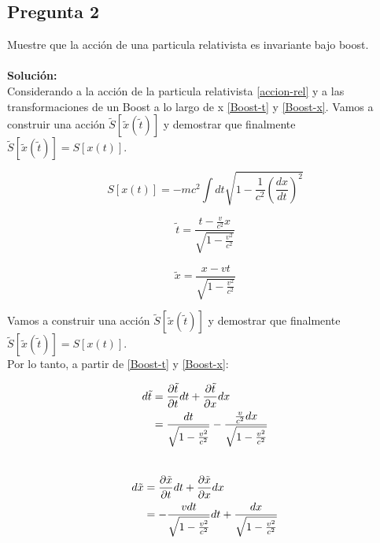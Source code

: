 \documentclass[../main_ej.tex]{subfiles}
\begin{document}
\subsection{Pregunta 2}
Muestre que la acción de una particula relativista es invariante bajo boost. \\
\\
\textbf{Solución:} 
\\

Considerando a la acción de la particula relativista \eqref{accion-rel} y a las transformaciones de un Boost a lo largo de x \eqref{Boost-t} y \eqref{Boost-x}. Vamos a construir una acción $\tilde{S}[\tilde{x}(\tilde{t})]$ y demostrar que finalmente $\tilde{S}[\tilde{x}(\tilde{t})] = S[x(t)]$. 

\begin{equation}
  S[x(t)] = -mc^2\int dt \sqrt{1 - \frac{1}{c^2}\left( \frac{dx}{dt} \right)^2} \label{accion-rel}
\end{equation}

\begin{equation}
  \tilde{t} = \frac{t - \frac{v}{c^2}x}{\sqrt{1 - \frac{v^2}{c^2}}} \label{Boost-t}
\end{equation}

\begin{equation}
  \tilde{x} = \frac{x - vt}{\sqrt{1 - \frac{v^2}{c^2}}} \label{Boost-x}
\end{equation}

Vamos a construir una acción $\tilde{S}[\tilde{x}(\tilde{t})]$ y demostrar que finalmente $\tilde{S}[\tilde{x}(\tilde{t})] = S[x(t)]$. \\

Por lo tanto, a partir de \eqref{Boost-t} y \eqref{Boost-x}: 

\begin{align}
  d\tilde{t} &= \frac{\partial \tilde{t}}{\partial t} dt + \frac{\partial \tilde{t}}{\partial x}dx \notag \\
  &= \frac{dt}{\sqrt{1 - \frac{v^2}{c^2}}} - \frac{\frac{v}{c^2}dx}{\sqrt{1 - \frac{v^{2}}{c^2}}} \label{dtilde}
\end{align}\\

\begin{align}
  d\tilde{x} &= \frac{\partial \tilde{x}}{\partial t}dt + \frac{\partial \tilde{x}}{\partial x}dx \notag\\
  &= -\frac{v dt}{\sqrt{1 - \frac{v^2}{c^2}}}dt + \frac{dx}{\sqrt{1- \frac{v^2}{c^2}}} \label{dequis} 
\end{align}\\
\end{document}
